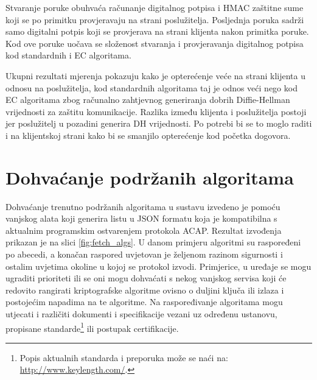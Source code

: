 Stvaranje poruke \listi{} obuhvaća računanje digitalnog potpisa i HMAC zaštitne
sume koji se po primitku provjeravaju na strani poslužitelja. Posljednja poruka
\listr{} sadrži samo digitalni potpis koji se provjerava na strani klijenta
nakon primitka poruke. Kod ove poruke uočava se složenost stvaranja i
provjeravanja digitalnog potpisa kod standardnih i EC algoritama.

Ukupni rezultati mjerenja pokazuju kako je opterećenje veće na strani
klijenta u odnosu na poslužitelja, kod standardnih algoritama taj je odnos
veći nego kod EC algoritama zbog računalno zahtjevnog generiranja
dobrih Diffie-Hellman vrijednosti za zaštitu komunikacije. Razlika između
klijenta i poslužitelja postoji jer poslužitelj u pozadini generira DH
vrijednosti. Po potrebi bi se to moglo raditi i na klijentskoj strani kako bi se
smanjilo opterećenje kod početka dogovora.

\section{Dohvaćanje podržanih algoritama}

Dohvaćanje trenutno podržanih algoritama u sustavu izvedeno je pomoću vanjskog
alata koji generira listu u JSON formatu koja je kompatibilna s aktualnim
programskim ostvarenjem protokola ACAP. Rezultat izvođenja prikazan je na slici
\ref{fig:fetch_algs}. U danom primjeru algoritmi su raspoređeni po abecedi,
a konačan raspored uvjetovan je željenom razinom sigurnosti i ostalim
uvjetima okoline u kojoj se protokol izvodi. Primjerice, u uređaje se mogu
ugraditi prioriteti ili se oni mogu dohvaćati s nekog vanjskog servisa koji
će redovito rangirati kriptografske algoritme ovisno o duljini ključa ili izlaza i
postojećim napadima na te algoritme. Na raspoređivanje algoritama mogu
utjecati i različiti dokumenti i specifikacije vezani uz određenu
ustanovu, propisane standarde\footnote{Popis aktualnih standarda i preporuka
može se naći na: \url{http://www.keylength.com/}.} ili postupak certifikacije.

